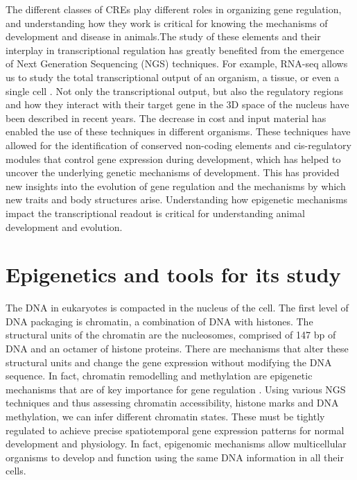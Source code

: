 The different classes of CREs play different roles in organizing gene regulation, and understanding how they work is critical for knowing the mechanisms of development and disease in animals.The study of these elements and their interplay in transcriptional regulation has greatly benefited from the emergence of Next Generation Sequencing (NGS) techniques. For example, RNA-seq allows us to study the total transcriptional output of an organism, a tissue, or even a single cell \parencite{wang_rna-seq_2009, sebe-pedros_cnidarian_2018, geirsdottir_cross-species_2019, farnsworth_single-cell_2020, gao_long_2022}. Not only the transcriptional output, but also the regulatory regions and how they interact with their target gene in the 3D space of the nucleus have been described in recent years. The decrease in cost and input material has enabled the use of these techniques in different organisms. These techniques have allowed for the identification of conserved non-coding elements and cis-regulatory modules that control gene expression during development, which has helped to uncover the underlying genetic mechanisms of development. This has provided new insights into the evolution of gene regulation and the mechanisms by which new traits and body structures arise. Understanding how epigenetic mechanisms impact the transcriptional readout is critical for understanding animal development and evolution.



\section{Epigenetics and tools for its study}


The DNA in eukaryotes is compacted in the nucleus of the cell. The first level of DNA packaging is chromatin, a combination of DNA with histones. The structural units of the chromatin are the nucleosomes, comprised of 147 bp of DNA and an octamer of histone proteins. There are mechanisms that alter these structural units and change the gene expression without modifying the DNA sequence. In fact, chromatin remodelling and methylation are epigenetic mechanisms that are of key importance for gene regulation \parencite{margueron_chromatin_2010, bonasio_molecular_2010, ashe_how_2021}. Using various NGS techniques and thus assessing chromatin accessibility, histone marks and DNA methylation, we can infer different chromatin states. These must be tightly regulated to achieve precise spatiotemporal gene expression patterns for normal development and physiology. In fact, epigenomic mechanisms allow multicellular organisms to develop and function using the same DNA information in all their cells. 

